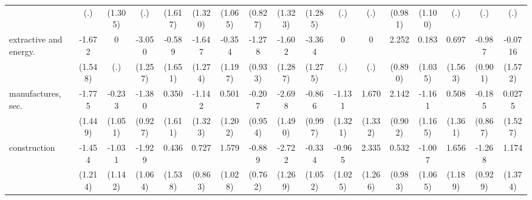 {\begin{tabular}{l*{16}{c}}
                    &         (.)         &     (1.305)         &         (.)         &     (1.617)         &     (1.320)         &     (1.065)         &     (0.827)         &     (1.323)         &     (1.285)         &         (.)         &         (.)         &     (0.981)         &     (1.100)         &         (.)         &         (.)         &         (.)         \\
[1em]
extractive and energy.&      -1.672         &           0         &      -3.050\sym{*}  &      -0.589         &      -1.647         &      -0.354         &      -1.278         &      -1.602         &      -3.364\sym{**} &           0         &           0         &       2.252\sym{*}  &       0.183         &       0.697         &      -0.987         &     -0.0716         \\
                    &     (1.548)         &         (.)         &     (1.257)         &     (1.651)         &     (1.274)         &     (1.197)         &     (0.933)         &     (1.287)         &     (1.275)         &         (.)         &         (.)         &     (0.890)         &     (1.035)         &     (1.563)         &     (0.901)         &     (1.572)         \\
[1em]
manufactures, sec.  &      -1.775         &      -0.233         &      -1.380         &       0.350         &      -1.142         &       0.501         &      -0.207         &      -2.698         &      -0.866         &      -1.131         &       1.670         &       2.142\sym{*}  &      -1.161         &       0.508         &      -0.185         &      0.0275         \\
                    &     (1.449)         &     (1.051)         &     (0.927)         &     (1.611)         &     (1.323)         &     (1.202)         &     (0.954)         &     (1.490)         &     (0.997)         &     (1.321)         &     (1.332)         &     (0.902)         &     (1.165)         &     (1.361)         &     (0.867)         &     (1.527)         \\
[1em]
construction        &      -1.454         &      -1.031         &      -1.929         &       0.436         &       0.727         &       1.579         &      -0.889         &      -2.722\sym{*}  &      -0.334         &      -0.965         &       2.335         &       0.532         &      -1.007         &       1.656         &      -1.268         &       1.174         \\
                    &     (1.214)         &     (1.142)         &     (1.064)         &     (1.538)         &     (0.863)         &     (1.028)         &     (0.762)         &     (1.269)         &     (1.052)         &     (1.025)         &     (1.266)         &     (0.983)         &     (1.065)         &     (1.189)         &     (0.929)         &     (1.374)         \\

\end{tabular}}
